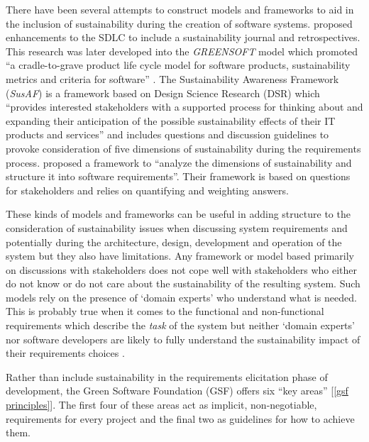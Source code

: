 There have been several attempts to construct models and frameworks to aid in the inclusion of sustainability during the creation of software systems. \citet{Dick2010} proposed enhancements to the SDLC to include a sustainability journal and retrospectives. This research was later developed into the \emph{GREENSOFT} model which promoted \enquote{a cradle-to-grave product life cycle model for software products, sustainability metrics and criteria for software} \citep{Naumann2011}. The Sustainability Awareness Framework (\emph{SusAF}) is a framework based on Design Science Research (DSR) \citep{VomBrocke2020} which \enquote{provides interested stakeholders with a supported process for thinking about and expanding their anticipation of the possible sustainability effects of their IT products and services} \citep{Betz2024} and includes questions and discussion guidelines to provoke consideration of five dimensions of sustainability during the requirements process. \citet{Saputri2016} proposed a framework to \enquote{analyze the dimensions of sustainability and structure it into software requirements}. Their framework is based on questions for stakeholders and relies on quantifying and weighting answers.

These kinds of models and frameworks can be useful in adding structure to the consideration of sustainability issues when discussing system requirements and potentially during the architecture, design, development and operation of the system but they also have limitations. Any framework or model based primarily on discussions with stakeholders does not cope well with stakeholders who either do not know or do not care about the sustainability of the resulting system. Such models rely on the presence of `domain experts' \citep{Christel1992} who understand what is needed. This is probably true when it comes to the functional and non-functional requirements which describe the \emph{task} of the system but neither `domain experts' nor software developers are likely to fully understand the sustainability impact of their requirements choices . 

Rather than include sustainability in the requirements elicitation phase of development, the Green Software Foundation (GSF) \citep{GreenSoftwareFioundation2024} offers six \enquote{key areas} [\autoref{gsf principles}]. The first four of these areas act as implicit, non-negotiable, requirements for every project and the final two as guidelines for how to achieve them.

